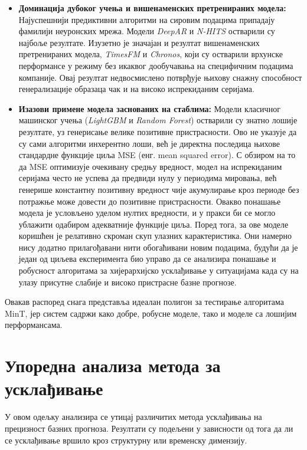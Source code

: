 \documentclass[12pt,oneside]{memoir}
\begin{document}
\begin{itemize}
    \item \textbf{Доминација дубоког учења и вишенаменских претренираних модела:} Најуспешнији предиктивни алгоритми на сировим подацима припадају фамилији неуронских мрежа. Модели \textit{DeepAR} и \textit{N-HITS} остварили су најбоље резултате. Изузетно је значајан и резултат вишенаменских претренираних модела, \textit{TimesFM} и \textit{Chronos}, који су остварили врхунске перформансе у режиму без икаквог дообучавања на специфичним подацима компаније. Овај резултат недвосмислено потврђује њихову снажну способност генерализације образаца чак и на високо испрекиданим серијама.
    
    \item \textbf{Изазови примене модела заснованих на стаблима:} Модели класичног машинског учења (\textit{LightGBM} и \textit{Random Forest}) остварили су знатно лошије резултате, уз генерисање велике позитивне пристрасности. Ово не указује да су сами алгоритми инхерентно лоши, већ је директна последица њихове стандардне функције циља MSE (енг. mean squared error). С обзиром на то да MSE оптимизује очекивану средњу вредност, модел на испрекиданим серијама често не успева да предвиди нулу у периодима мировања, већ генерише константну позитивну вредност чије акумулирање кроз периоде без потражње може довести до позитивне пристрасности.  Овакво понашање модела је условљено уделом нултих вредности, и у пракси би се могло ублажити одабиром адекватније функције циља. Поред тога, за ове моделе коришћен је релативно скроман скуп улазних карактеристика. Они намерно нису додатно прилагођавани нити обогаћивани новим подацима, будући да је један од циљева експеримента био управо да се анализира понашање и робусност алгоритама за хијерархијско усклађивање у ситуацијама када су на улазу присутне слабије и високо пристрасне базне прогнозе.
\end{itemize}


Овакав распоред снага представља идеалан полигон за тестирање алгоритама MinT, јер систем садржи како добре, робусне моделе, тако и моделе са лошијим перформансама.
  

\section{Упоредна анализа метода за усклађивање}

У овом одељку анализира се утицај различитих метода усклађивања на прецизност базних прогноза. Резултати су подељени у зависности од тога да ли се усклађивање вршило кроз структурну или временску димензију. 
\end{document}
